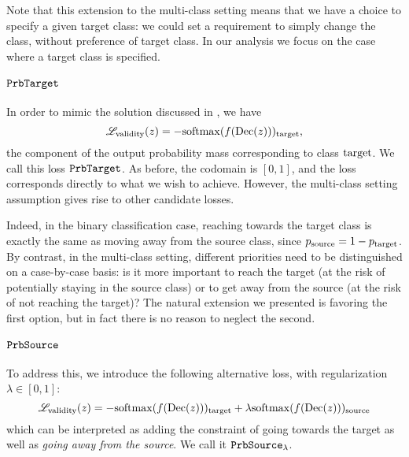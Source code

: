 \documentclass[../main.tex]{subfiles}
\begin{document}
Note that this extension to the multi-class setting means that we have a choice to specify a given target class: we could set a requirement to simply change the class, without preference of target class.
In our analysis we focus on the case where a target class is specified.


\paragraph{$\mathtt{PrbTarget}$}

In order to mimic the solution discussed in \cite{cohenGifsplanation2022}, we have
\begin{equation}
    \mathscr{L}_\text{validity}(z) = -\mathrm{softmax}(f(\operatorname{Dec}(z)))_{\mathrm{target}},
\end{equation}
\ie{} the component of the output probability mass corresponding to class $\mathrm{target}$.
We call this loss $\mathtt{PrbTarget}$.
As before, the codomain is $[0, 1]$, and the loss corresponds directly to what we wish to achieve.
However, the multi-class setting assumption gives rise to other candidate losses.

Indeed, in the binary classification case, reaching towards the target class is exactly the same as moving away from the source class, since $p_{\mathrm{source}} = 1 - p_{\mathrm{target}}$.
By contrast, in the multi-class setting, different priorities need to be distinguished on a case-by-case basis: is it more important to reach the target (at the risk of potentially staying in the source class) or to get away from the source (at the risk of not reaching the target)?
The natural extension we presented is favoring the first option, but in fact there is no reason to neglect the second.

\paragraph{$\mathtt{PrbSource}_{}$}

To address this, we introduce the following alternative loss, with regularization $\lambda \in [0, 1]$:
\begin{equation}
    \mathscr{L}_\text{validity}(z) = -\mathrm{softmax}(f(\operatorname{Dec}(z)))_{\mathrm{target}}
+ \lambda \mathrm{softmax}(f(\operatorname{Dec}(z)))_{\mathrm{source}}
\end{equation}
which can be interpreted as adding the constraint of going towards the target as well as \emph{going away from the source}.
We call it $\mathtt{PrbSource}_{\lambda}$.
\end{document}

